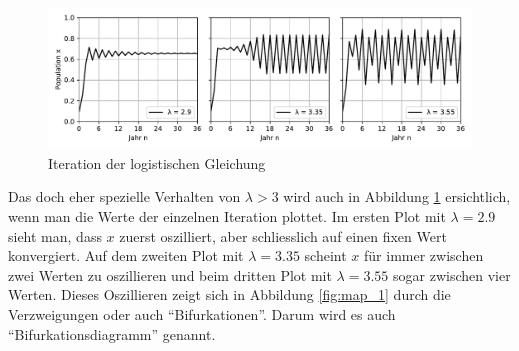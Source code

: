 \begin{figure}
    \includegraphics[width=\linewidth]{papers/logistic/figures/pop_logistic_2.pdf}
    \caption{Iteration der logistischen Gleichung}
    \label{fig:pop_logistic_2}
\end{figure}
Das doch eher spezielle Verhalten von $\lambda > 3$ wird 
auch in Abbildung \ref{fig:pop_logistic_2} ersichtlich,
wenn man die Werte der einzelnen Iteration plottet.
Im ersten Plot mit $\lambda = 2.9$ sieht man, dass $x$ zuerst oszilliert,
aber schliesslich auf einen fixen Wert konvergiert.
Auf dem zweiten Plot mit $\lambda = 3.35$ scheint $x$ 
für immer zwischen zwei Werten zu oszillieren und beim
dritten Plot mit $\lambda = 3.55$ sogar zwischen vier Werten. 
Dieses Oszillieren zeigt sich in Abbildung \ref{fig:map_1}
durch die Verzweigungen oder auch ``Bifurkationen''. 
Darum wird es auch ``Bifurkationsdiagramm'' genannt. 


